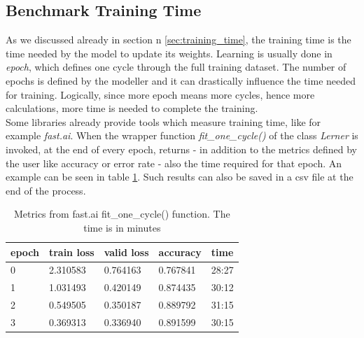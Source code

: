 \subsection{Benchmark Training Time}\label{b_trainig_time}
As we discussed already in section n \ref{sec:training_time}, the training time is the time needed by the model to update its weights. Learning is usually done in \textit{epoch}, which defines one cycle through the full training dataset. \cite{Afaq2020SignificanceOE} The number of epochs is defined by the modeller and it can drastically influence the time needed for training. Logically, since more epoch means more cycles, hence more calculations, more time is needed to complete the training.\\
Some libraries already provide tools which measure training time, like for example \textit{fast.ai}. When the wrapper function \textit{fit\_one\_cycle()} of the class \textit{Lerner} is invoked, at the end of every epoch, returns - in addition to the metrics defined by the user like accuracy or error rate - also the time required for that epoch. An example can be seen in table \ref{tab:m_fast}. Such results can also be saved in a csv file at the end of the process. \\
\begin{table}[h]
\centering
\begin{tabular}{ p{1cm} p{2cm} p{2cm} p{2cm} p{2cm}   }
 epoch&train loss &valid loss & accuracy &time\\
 \hline
0	&2.310583	&0.764163	&0.767841	&28:27\\
1	&1.031493	&0.420149	&0.874435	&30:12\\
2	&0.549505	&0.350187	&0.889792	&31:15\\
3	&0.369313	&0.336940	&0.891599	&30:15\\

 \hline
\end{tabular}
\caption[Metrics from fast.ai fit\_one\_cycle() function]{Metrics from fast.ai fit\_one\_cycle() function. The time is in minutes}
\label{tab:m_fast}
\end{table}



